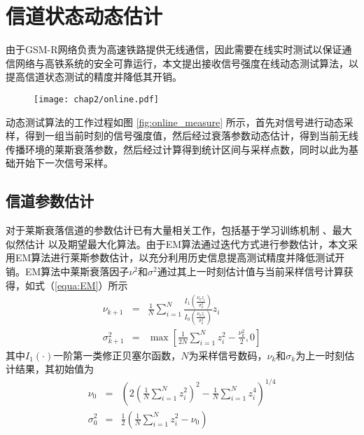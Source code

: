 \section{信道状态动态估计}
\label{sec:dynamic}

由于GSM-R网络负责为高速铁路提供无线通信，因此需要在线实时测试以保证通信网络与高铁系统的安全可靠运行，本文提出接收信号强度在线动态测试算法，以提高信道状态测试的精度并降低其开销。

\begin{figure}[!htp]
\centering
\texttt{[image: chap2/online.pdf]}
\end{figure}

动态测试算法的工作过程如图 \ref{fig:online_measure} 所示，首先对信号进行动态采样，得到一组当前时刻的信号强度值，然后经过衰落参数动态估计，得到当前无线传播环境的莱斯衰落参数，然后经过计算得到统计区间与采样点数，同时以此为基础开始下一次信号采样。

\subsection{信道参数估计}
\label{sec:estimation}

对于莱斯衰落信道的参数估计已有大量相关工作，包括基于学习训练机制 、最大似然估计  以及期望最大化算法。由于EM算法通过迭代方式进行参数估计，本文采用EM算法进行莱斯参数估计，以充分利用历史信息提高测试精度并降低测试开销。EM算法中莱斯衰落因子$\nu^2$和$\sigma^2$通过其上一时刻估计值与当前采样信号计算获得，如式（\ref{equa:EM}）所示
\begin{subequations}
  \begin{eqnarray}
    \nu_{k+1}&=&\frac{1}{N}\sum_{i=1}^{N}\frac{I_{1}\left(\frac{\nu_{k}z_{i}}{\sigma_k^2}\right)}{I_{0}\left(\frac{\nu_{k}z_{i}}{\sigma_k^2}\right)}z_i \\
    \sigma_{k+1}^2&=&\max{\left[\frac{1}{2N}\sum_{i=1}^N z_i^2 -\frac{\nu_k^2}{2},0\right]}
  \end{eqnarray}
\label{equa:EM}
\end{subequations}
其中$I_1(\cdot)$一阶第一类修正贝塞尔函数，$N$为采样信号数码，$\nu_k$和$\sigma_k$为上一时刻估计结果，其初始值为
\begin{subequations}
  \begin{eqnarray}
    \nu_{0}&=& \left(2\left(\frac{1}{N}\sum_{i=1}^N z_i^2\right)^2-\frac{1}{N}\sum_{i=1}^N z_i^4\right)^{1/4} \\
    \sigma_{0}^2&=&\frac{1}{2}\left(\frac{1}{N}\sum_{i=1}^N z_i^2 - \nu_{0}\right)
  \end{eqnarray}
\label{equa:EM0}
\end{subequations}

